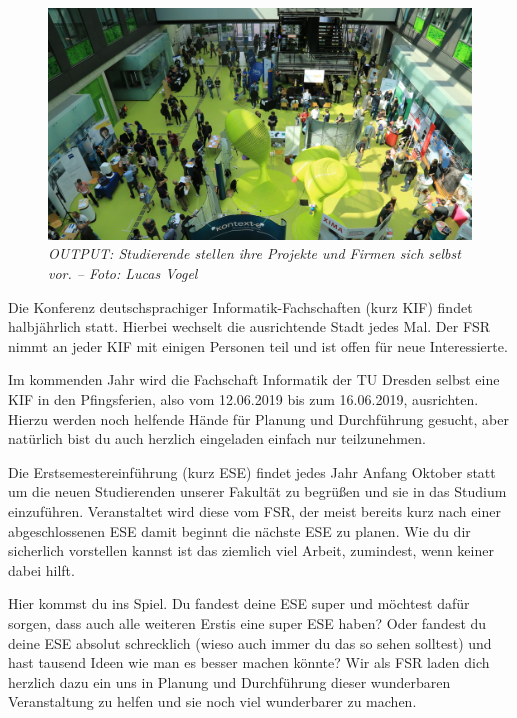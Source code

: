\begin{figure}[b!]
	\centering
  \includegraphics[width=\linewidth]{img/output}
  \caption*{\small \centering \textit{OUTPUT\@: Studierende stellen ihre Projekte und Firmen sich selbst vor. -- Foto: Lucas Vogel}}
\end{figure}%


Die Konferenz deutschsprachiger Informatik-Fachschaften (kurz KIF) findet halbjährlich statt. Hierbei wechselt die ausrichtende Stadt jedes Mal. Der FSR nimmt an jeder KIF mit einigen Personen teil und ist offen für neue Interessierte.

Im kommenden Jahr wird die Fachschaft Informatik der TU Dresden selbst eine KIF in den Pfingsferien, also vom 12.06.2019 bis zum 16.06.2019, ausrichten. Hierzu werden noch helfende Hände für Planung und Durchführung gesucht, aber natürlich bist du auch herzlich eingeladen einfach nur teilzunehmen.

\pagebreak


Die Erstsemestereinführung (kurz ESE) findet jedes Jahr Anfang Oktober statt um die neuen Studierenden unserer Fakultät zu begrüßen und sie in das Studium einzuführen. Veranstaltet wird diese vom FSR, der meist bereits kurz nach einer abgeschlossenen ESE damit beginnt die nächste ESE zu planen. Wie du dir sicherlich vorstellen kannst ist das ziemlich viel Arbeit, zumindest, wenn keiner dabei hilft.

Hier kommst du ins Spiel. Du fandest deine ESE super und möchtest dafür sorgen, dass auch alle weiteren Erstis eine super ESE haben? Oder fandest du deine ESE absolut schrecklich (wieso auch immer du das so sehen solltest) und hast tausend Ideen wie man es besser machen könnte? Wir als FSR laden dich herzlich dazu ein uns in Planung und Durchführung dieser wunderbaren Veranstaltung zu helfen und sie noch viel wunderbarer zu machen.

